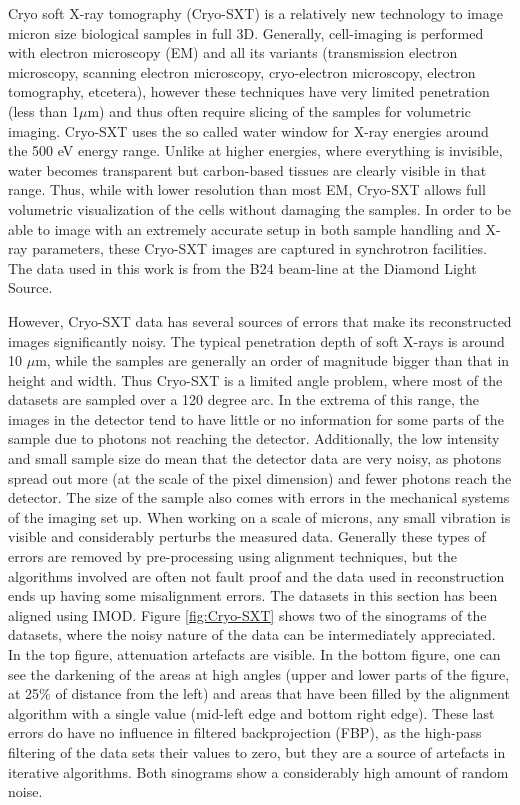 Cryo soft X-ray tomography (Cryo-SXT) is a relatively new technology to image micron size biological samples in full 3D\cite{carzaniga2014cryo}. Generally, cell-imaging is performed with electron microscopy (EM) and all its variants (transmission electron microscopy, scanning electron microscopy, cryo-electron microscopy, electron tomography, etcetera), however these techniques have very limited penetration (less than 1$\mu$m) and thus often require slicing of the samples for volumetric imaging. Cryo-SXT uses the so called water window for X-ray energies around the 500 eV energy range. Unlike at higher energies, where everything is invisible, water becomes transparent but carbon-based tissues are clearly visible in that range. Thus, while with lower resolution than most EM, Cryo-SXT allows full volumetric visualization of the cells without damaging the samples. In order to be able to image with an extremely accurate setup in both sample handling and X-ray parameters, these Cryo-SXT images are captured in synchrotron facilities. The data used in this work is from the B24 beam-line at the Diamond Light Source.

However, Cryo-SXT data has several sources of errors that make its reconstructed images significantly noisy. The typical penetration depth of soft X-rays is around 10 $\mu$m, while the samples are generally an order of magnitude bigger than that in height and width. Thus Cryo-SXT is a limited angle problem, where most of the datasets are sampled over a 120 degree arc. In the extrema of this range, the images in the detector tend to have little or no information for some parts of the sample due to photons not reaching the detector. Additionally, the low intensity and small sample size do mean that the detector data are very noisy, as photons spread out more (at the scale of the pixel dimension) and fewer photons reach the detector. The size of the sample also comes with errors in the mechanical systems of the imaging set up. When working on a scale of microns, any small vibration is visible and considerably perturbs the measured data. Generally these types of errors are removed by pre-processing using alignment techniques, but the algorithms involved are often not fault proof and the data used in reconstruction ends up having some misalignment errors. The datasets in this section has been aligned using IMOD\cite{mastronarde1997dual}. Figure \ref{fig:Cryo-SXT} shows two of the sinograms of the datasets, where the noisy nature of the data can be intermediately appreciated. In the top figure, attenuation artefacts are visible. In the bottom figure, one can see the darkening of the areas at high angles (upper and lower parts of the figure, at 25\% of distance from the left) and areas that have been filled by the alignment algorithm with a single value (mid-left edge and bottom right edge). These last errors do have no influence in filtered backprojection (FBP), as the high-pass filtering of the data sets their values to zero, but they are a source of artefacts in iterative algorithms. Both sinograms show a considerably high amount of random noise.


